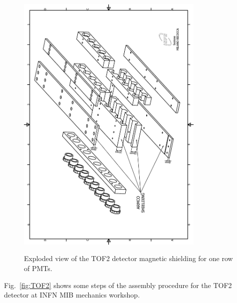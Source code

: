 \begin{figure}
  \begin{center}
  \includegraphics[width=9cm,angle=-90]{./02-TOF/Figures/TOF2.eps} \\
  \caption{Exploded view of the TOF2 detector magnetic shielding for one row of PMTs.}
  \label{fig:TOF1}
  \end{center}
\end{figure}
Fig.~\ref{fig:TOF2} shows some steps of the assembly procedure for the TOF2 
detector at INFN MIB mechanics workshop. 
